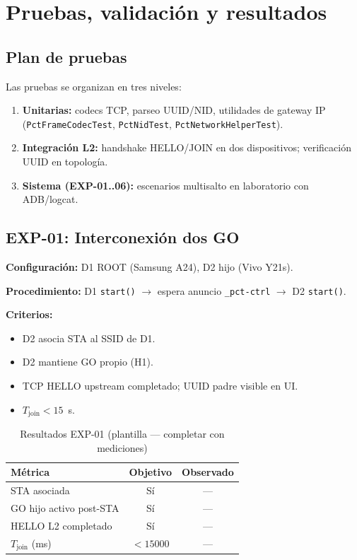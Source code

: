 \chapter{Pruebas, validación y resultados}
\label{cap:pruebas}

\section{Plan de pruebas}
\label{sec:plan-pruebas}

Las pruebas se organizan en tres niveles:

\begin{enumerate}
  \item \textbf{Unitarias:} codecs TCP, parseo UUID/NID, utilidades de gateway IP (\texttt{PctFrameCodecTest}, \texttt{PctNidTest}, \texttt{PctNetworkHelperTest}).
  \item \textbf{Integración L2:} handshake HELLO/JOIN en dos dispositivos; verificación UUID en topología.
  \item \textbf{Sistema (EXP-01..06):} escenarios multisalto en laboratorio con ADB/logcat.
\end{enumerate}

\section{EXP-01: Interconexión dos GO}
\label{sec:resultados-exp01}

\textbf{Configuración:} D1 ROOT (Samsung A24), D2 hijo (Vivo Y21s).

\textbf{Procedimiento:} D1 \texttt{start()} $\rightarrow$ espera anuncio \texttt{\_pct-ctrl} $\rightarrow$ D2 \texttt{start()}.

\textbf{Criterios:}
\begin{itemize}
  \item D2 asocia STA al SSID de D1.
  \item D2 mantiene GO propio (H1).
  \item TCP HELLO upstream completado; UUID padre visible en UI.
  \item $T_{\mathrm{join}} < 15$~s.
\end{itemize}

\begin{table}[htbp]
  \centering
  \caption{Resultados EXP-01 (plantilla --- completar con mediciones)}
  \label{tab:exp01}
  \begin{tabular}{@{}lcc@{}}
    \toprule
    \textbf{Métrica} & \textbf{Objetivo} & \textbf{Observado} \\
    \midrule
    STA asociada            & Sí  & --- \\
    GO hijo activo post-STA & Sí  & --- \\
    HELLO L2 completado     & Sí  & --- \\
    $T_{\mathrm{join}}$ (ms) & $<15000$ & --- \\
    \bottomrule
  \end{tabular}
\end{table}

